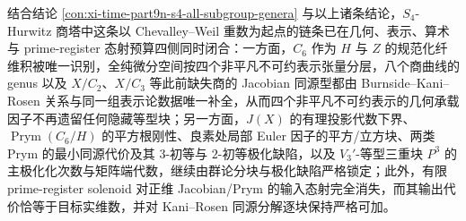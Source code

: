 \noindent
结合结论 \ref{con:xi-time-part9n-s4-all-subgroup-genera} 与以上诸条结论，\(S_4\)-Hurwitz 商塔中这条以 Chevalley--Weil 重数为起点的链条已在几何、表示、算术与 prime-register 态射预算四侧同时闭合：一方面，\(C_6\) 作为 \(H\) 与 \(Z\) 的规范化纤维积被唯一识别，全纯微分空间按四个非平凡不可约表示张量分层，八个商曲线的 genus 以及 \(X/C_2\)、\(X/C_3\) 等此前缺失商的 Jacobian 同源型都由 Burnside--Kani--Rosen 关系与同一组表示论数据唯一补全，从而四个非平凡不可约表示的几何承载因子不再遗留任何隐藏等型块；另一方面，\(J(X)\) 的有理投影代数下界、\(\operatorname{Prym}(C_6/H)\) 的平方根刚性、良素处局部 Euler 因子的平方/立方块、两类 Prym 的最小同源代价及其 \(3\)-初等与 \(2\)-初等极化缺陷，以及 \(V_3'\)-等型三重块 \(P^3\) 的主极化化次数与矩阵端代数，继续由群论分块与极化缺陷严格锁定；此外，有限 prime-register solenoid 对正维 Jacobian/Prym 的输入态射完全消失，而其输出代价恰等于目标实维数，并对 Kani--Rosen 同源分解逐块保持严格可加。

\endinput
